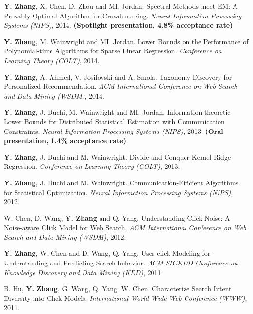 \documentclass{res}
\begin{document}
\begin{resume}
\begin{enumerate}[label={[C\arabic*]}, ref={C\arabic*}]
\item \textbf{Y. Zhang}, X. Chen, D. Zhou and MI. Jordan. Spectral Methods meet EM: A Provably Optimal Algorithm for Crowdsourcing.
\emph{Neural Information Processing Systems (NIPS)}, 2014. \textbf{(Spotlight presentation, 4.8\% acceptance rate)}
\label{spectral-nips14}

\item \textbf{Y. Zhang}, M. Wainwright and MI. Jordan. Lower Bounds on the Performance of Polynomial-time Algorithms for Sparse Linear Regression. \emph{Conference on Learning Theory (COLT)}, 2014. \label{lower-colt14}

\item \textbf{Y. Zhang}, A. Ahmed, V. Josifovski and A. Smola. Taxonomy Discovery for Personalized Recommendation. \emph{ACM International Conference on Web Search and Data Mining (WSDM)}, 2014. \label{taxonomy-wsdm14}

\item \textbf{Y. Zhang}, J. Duchi, M. Wainwright and MI. Jordan. Information-theoretic Lower Bounds for Distributed Statistical Estimation with Communication Constraints.
\emph{Neural Information Processing Systems (NIPS)}, 2013. \textbf{(Oral presentation, 1.4\% acceptance rate)}
\label{information-nips13}

\item  \textbf{Y. Zhang}, J. Duchi and M. Wainwright. Divide and Conquer Kernel Ridge Regression.
\emph{Conference on Learning Theory (COLT)}, 2013. \label{divide-colt13}

\item  \textbf{Y. Zhang}, J. Duchi and M. Wainwright. Communication-Efficient Algorithms for Statistical Optimization.
\emph{Neural Information Processing Systems (NIPS)}, 2012. \label{communication-nips12}

\item  W. Chen, D. Wang, \textbf{Y. Zhang} and Q. Yang. Understanding Click Noise: A Noise-aware Click Model for Web Search.
\emph{ACM International Conference on Web Search and Data Mining (WSDM)}, 2012. \label{understanding-wsdm12}

\item  \textbf{Y. Zhang}, W, Chen and D, Wang, Q. Yang. User-click Modeling for Understanding and Predicting Search-behavior.
\emph{ACM SIGKDD Conference on Knowledge Discovery and Data Mining (KDD)}, 2011.\label{user-kdd11}
\item B. Hu, \textbf{Y. Zhang}, G. Wang, Q. Yang, W. Chen. Characterize Search Intent Diversity into Click Models.
\emph{International World Wide Web Conference (WWW)}, 2011. \label{characterize-www11}


\end{enumerate}
\end{resume}
\end{document}
